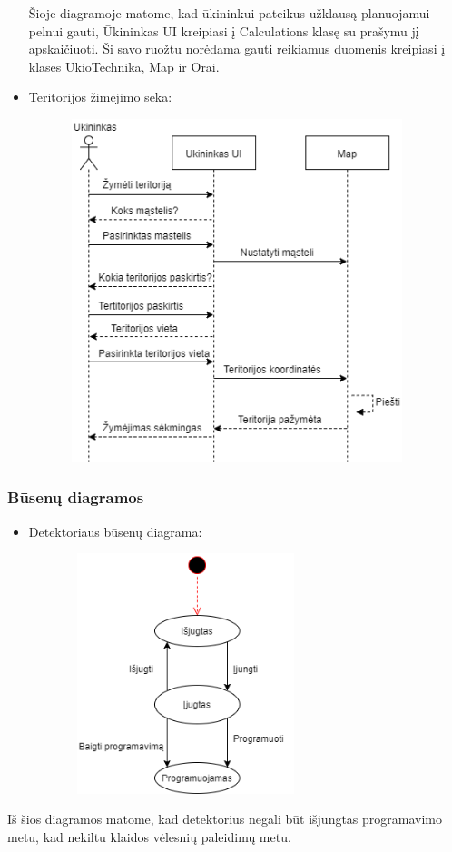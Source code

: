 \documentclass[oneside]{VUMIFPSkursinis}
\begin{document}
\begin{itemize}
\begin{figure}[H]
	\caption{}
	\label{fig:PelnoSkaičiavimas}
\end{figure}
Šioje diagramoje matome, kad ūkininkui pateikus užklausą planuojamui pelnui gauti, Ūkininkas UI kreipiasi į Calculations klasę su prašymu jį apskaičiuoti. Ši savo ruožtu norėdama gauti reikiamus duomenis kreipiasi į klases UkioTechnika, Map ir Orai.
\item Teritorijos žimėjimo seka:
	\begin{figure}[H]
		\centering	
	\includegraphics[width=10cm,height=10cm,keepaspectratio]{ŽymėtiTeritorijas.png}
	\caption{}
	\label{fig:ŽymėtiTeritorijas}
\end{figure}

\end{itemize}
\subsubsection{Būsenų diagramos}
\begin{itemize}
\item Detektoriaus būsenų diagrama:

		\begin{figure}[H]
		\centering	
	\includegraphics[width=7cm,height=7cm,keepaspectratio]{BusenuDetektorius.png}
	\caption{}
	\label{fig:BusenuDetektorius}
\end{figure}

\end{itemize}
Iš šios diagramos  matome, kad detektorius negali būt išjungtas programavimo metu, kad nekiltu klaidos vėlesnių paleidimų metu.
\end{document}
